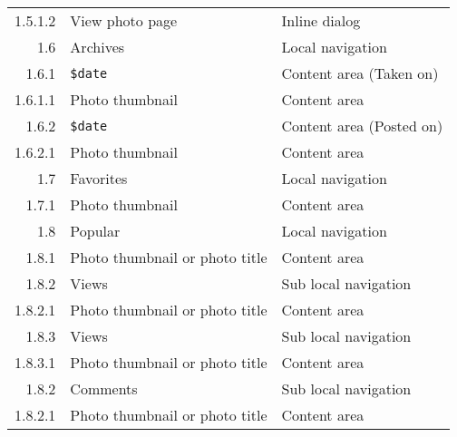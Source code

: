 \documentclass[11pt,a4paper]{article}
\newcommand{\var}[1]{\texttt{\${#1}}}
\begin{document}
\begin{center}
\begin{small}
\begin{longtable}{rll}
            1.5.1.2 &
            View photo page &
            Inline dialog \\

        1.6 &
        Archives &
        Local navigation \\

          1.6.1 &
          \var{date} &
          Content area (Taken on) \\

            1.6.1.1 &
            Photo thumbnail &
            Content area \\

          1.6.2 &
          \var{date} &
          Content area (Posted on) \\

            1.6.2.1 &
            Photo thumbnail &
            Content area \\

        1.7 &
        Favorites &
        Local navigation \\

          1.7.1 &
          Photo thumbnail &
          Content area \\

        1.8 &
        Popular &
        Local navigation \\

          1.8.1 &
          Photo thumbnail or photo title &
          Content area \\

          1.8.2 &
          Views &
          Sub local navigation \\

            1.8.2.1 &
            Photo thumbnail or photo title &
            Content area \\

          1.8.3 &
          Views &
          Sub local navigation \\

            1.8.3.1 &
            Photo thumbnail or photo title &
            Content area \\

          1.8.2 &
          Comments &
          Sub local navigation \\

            1.8.2.1 &
            Photo thumbnail or photo title &
            Content area \\




    \end{longtable}
  \end{small}
\end{center}
\end{document}

